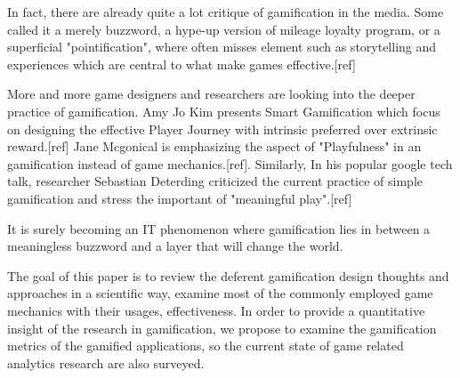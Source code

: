In fact, there are already quite a lot critique of gamification in the media. Some called it a merely buzzword, a hype-up version of mileage loyalty program, or a superficial "pointification", where often misses element such as storytelling and experiences which are central to what make games effective.[ref]

More and more game designers and researchers are looking into the deeper practice of gamification. Amy Jo Kim presents Smart Gamification which focus on designing the effective Player Journey with intrinsic preferred over extrinsic reward.[ref] Jane Mcgonical is emphasizing the aspect of "Playfulness" in an gamification instead of game mechanics.[ref]. Similarly, In his popular google tech talk, researcher Sebastian Deterding criticized the current practice of simple gamification and stress the important of "meaningful play".[ref]

It is surely becoming an IT phenomenon where gamification lies in between a meaningless buzzword and a layer that will change the world.

The goal of this paper is to review the deferent gamification design thoughts and approaches in a scientific way, examine most of the commonly employed game mechanics with their usages, effectiveness. In order to provide a quantitative insight of the research in gamification, we propose to examine the gamification metrics of the gamified applications, so the current state of game related analytics research are also surveyed.
